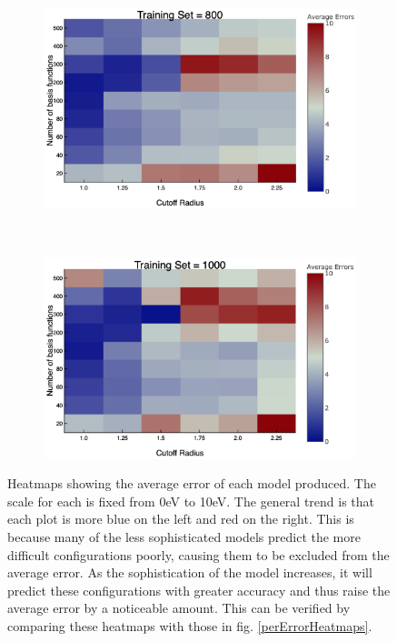 \begin{figure}
\begin{subfigure}{0.5\textwidth}
    \caption{} 
    \label{aveErrors6}
  \end{subfigure}%
    \hspace*{\fill}   %
  \begin{subfigure}{0.5\textwidth}
    \includegraphics[width=\linewidth]{Figures/aveErrors8}
    \caption{} 
    \label{aveErrors8}
  \end{subfigure}%
    \\
  \begin{subfigure}{0.5\textwidth}
    \includegraphics[width=\linewidth]{Figures/aveErrors10}
    \caption{} 
    \label{aveErrors10}
  \end{subfigure}%
\caption{Heatmaps showing the average error of each model produced. The scale for each is fixed from 0eV to 10eV. The general trend is that each plot is more blue on the left and red on the right. This is because many of the less sophisticated models predict the more difficult configurations poorly, causing them to be excluded from the average error. As the sophistication of the model increases, it will predict these configurations with greater accuracy and thus raise the average error by a noticeable amount. This can be verified by comparing these heatmaps with those in fig. \ref{perErrorHeatmaps}.
\label{aveErrorHeatmaps}}
\end{figure}


